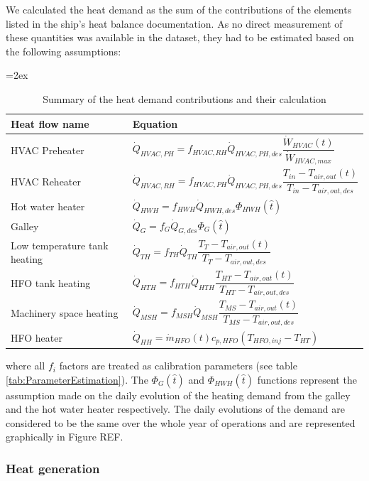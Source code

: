 \documentclass[preprint,12pt]{elsarticle}
\begin{document}
We calculated the heat demand as the sum of the contributions of the elements listed in the ship's heat balance documentation. As no direct measurement of these quantities was available in the dataset, they had to be estimated based on the following assumptions:
\begin{table}
	\centering
	{\tablinesep=2ex\tabcolsep=10pt
		\begin{tabular}{p{2.8cm}l}
			\hline 
			Heat flow name & Equation \\
			\hline
			HVAC Preheater & $\dot{Q}_{HVAC,PH} = f_{HVAC,RH} \dot{Q}_{HVAC,PH,des} \dfrac{\dot{W}_{HVAC}(t)}{\dot{W}_{HVAC,max}} $ \\
			HVAC Reheater &	$\dot{Q}_{HVAC,RH} = f_{HVAC,PH} \dot{Q}_{HVAC,PH,des} \dfrac{T_{in} - T_{air,out}(t)}{T_{in} - T_{air,out,des}}$ \\
			Hot water heater& $\dot{Q}_{HWH} = f_{HWH} \dot{Q}_{HWH,des} \Phi_{HWH}(\hat{t})$ \\
			Galley & $\dot{Q}_{G} = f_{G} \dot{Q}_{G,des} \Phi_G(\hat{t})$ \\
			Low temperature tank heating & $\dot{Q}_{TH} = f_{TH} \dot{Q}_{TH} \dfrac{T_{T} - T_{air,out}(t)}{T_{T} -T_{air,out,des}}$ \\
			HFO tank heating & $\dot{Q}_{HTH} = f_{HTH} \dot{Q}_{HTH} \dfrac{T_{HT} - T_{air,out}(t)}{T_{HT} - T_{air,out,des}}$ \\
			Machinery space heating & $\dot{Q}_{MSH} = f_{MSH} \dot{Q}_{MSH} \dfrac{T_{MS} - T_{air,out}(t)}{T_{MS} - T_{air,out,des}}$ \\
			HFO heater & $\dot{Q}_{HH} = \dot{m}_{HFO}(t) c_{p,HFO} (T_{HFO,inj} - T_{HT})$ \\
			\hline
	\end{tabular}}
	\caption{Summary of the heat demand contributions and their calculation}
	\label{tab:HeatDemand}
\end{table}
	
where all $f_i$ factors are treated as calibration parameters (see table \ref{tab:ParameterEstimation}). The $\Phi_G(\hat{t})$ and $\Phi_{HWH}(\hat{t})$ functions represent the assumption made on the daily evolution of the heating demand from the galley and the hot water heater respectively. The daily evolutions of the demand are considered to be the same over the whole year of operations and are represented graphically in Figure REF.
	
	
	
\subsubsection{Heat generation}
	
\end{document}
